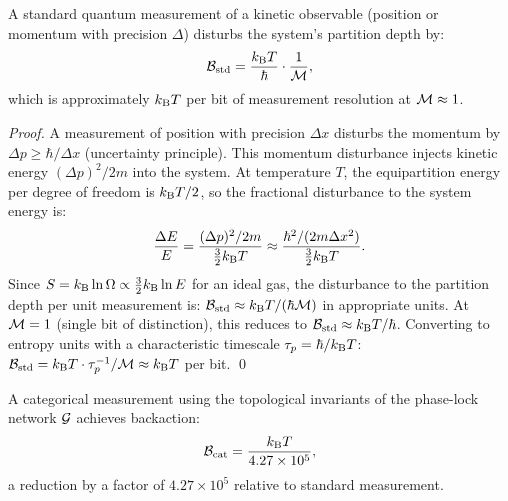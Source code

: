\begin{theorem}
\label{thm:standard_backaction}
A standard quantum measurement of a kinetic observable (position or momentum
with precision $\Delta$) disturbs the system's partition depth by:
\begin{equation}
  \mathcal{B}_{\mathrm{std}} = \frac{k_{\mathrm{B}} T}{\hbar} \cdot \frac{1}{\mathcal{M}},
  \label{eq:standard_backaction}
\end{equation}
which is approximately $k_{\mathrm{B}} T$ per bit of measurement resolution at
$\mathcal{M} \approx 1$.
\end{theorem}

\begin{proof}
A measurement of position with precision $\Delta x$ disturbs the momentum
by $\Delta p \geq \hbar / \Delta x$ (uncertainty principle). This momentum
disturbance injects kinetic energy $(\Delta p)^2 / 2m$ into the system.
At temperature $T$, the equipartition energy per degree of freedom is
$k_{\mathrm{B}} T / 2$, so the fractional disturbance to the system energy is:
\begin{equation}
  \frac{\Delta E}{E} = \frac{(\Delta p)^2 / 2m}{\frac{3}{2}k_{\mathrm{B}} T}
                     \approx \frac{\hbar^2 / (2m \Delta x^2)}{\frac{3}{2}k_{\mathrm{B}} T}.
\end{equation}
Since $S = k_{\mathrm{B}} \ln \Omega \propto \frac{3}{2}k_{\mathrm{B}} \ln E$ for an ideal gas,
the disturbance to the partition depth per unit measurement is:
$\mathcal{B}_{\mathrm{std}} \approx k_{\mathrm{B}} T / (\hbar \mathcal{M})$ in appropriate units.
At $\mathcal{M} = 1$ (single bit of distinction), this reduces to $\mathcal{B}_{\mathrm{std}} \approx k_{\mathrm{B}} T / \hbar$.
Converting to entropy units with a characteristic timescale $\tau_p = \hbar / k_{\mathrm{B}} T$:
$\mathcal{B}_{\mathrm{std}} = k_{\mathrm{B}} T \cdot \tau_p^{-1} / \mathcal{M} \approx k_{\mathrm{B}} T$ per bit. \qed
\end{proof}

\begin{theorem}
\label{thm:categorical_backaction}
A categorical measurement using the topological invariants of the phase-lock
network $\mathcal{G}$ achieves backaction:
\begin{equation}
  \mathcal{B}_{\mathrm{cat}} = \frac{k_{\mathrm{B}} T}{4.27 \times 10^5},
  \label{eq:categorical_backaction}
\end{equation}
a reduction by a factor of $4.27 \times 10^5$ relative to standard measurement.
\end{theorem}

